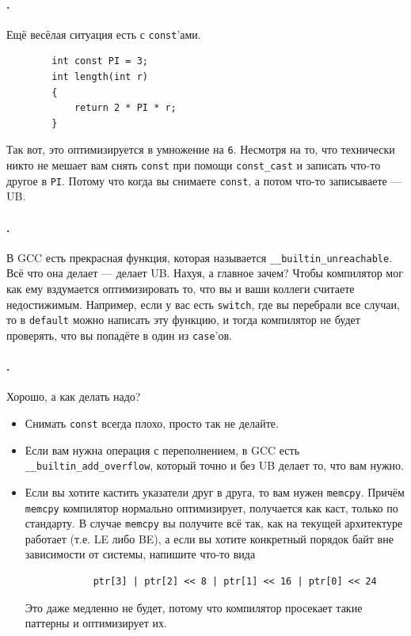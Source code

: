 \documentclass{article}
\begin{document}
    \paragraph{.}
    Ещё весёлая ситуация есть с \texttt{const}'ами.
    \begin{verbatim}
        int const PI = 3;
        int length(int r)
        {
            return 2 * PI * r;
        }
    \end{verbatim}
    Так вот, это оптимизируется в умножение на \texttt{6}. Несмотря на то, что технически никто не мешает вам снять \texttt{const} при помощи \texttt{const_cast} и записать что-то другое в \texttt{PI}. Потому что когда вы снимаете \texttt{const}, а потом что-то записываете --- UB.
    \paragraph{.}
    В GCC есть прекрасная функция, которая называется \texttt{__builtin_unreachable}. Всё что она делает --- делает UB. Нахуя, а главное зачем? Чтобы компилятор мог как ему вздумается оптимизировать то, что вы и ваши коллеги считаете недостижимым. Например, если у вас есть \texttt{switch}, где вы перебрали все случаи, то в \texttt{default} можно написать эту функцию, и тогда компилятор не будет проверять, что вы попадёте в один из \texttt{case}'ов.
    \paragraph{.}
    Хорошо, а как делать надо?
    \begin{itemize}
        \item Снимать \texttt{const} всегда плохо, просто так не делайте.
        \item Если вам нужна операция с переполнением, в GCC есть \texttt{__builtin_add_overflow}, который точно и без UB делает то, что вам нужно.
        \item Если вы хотите кастить указатели друг в друга, то вам нужен \texttt{memcpy}. Причём \texttt{memcpy} компилятор нормально оптимизирует, получается как каст, только по стандарту. В случае \texttt{memcpy} вы получите всё так, как на текущей архитектуре работает (т.е. LE либо BE), а если вы хотите конкретный порядок байт вне зависимости от системы, напишите что-то вида
        \begin{verbatim}
            ptr[3] | ptr[2] << 8 | ptr[1] << 16 | ptr[0] << 24
        \end{verbatim}
        Это даже медленно не будет, потому что компилятор просекает такие паттерны и оптимизирует их.
    \end{itemize}
\end{document}
